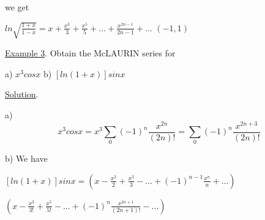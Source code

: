 \documentclass[11pt,a4paper]{article}
\begin{document}
we get  \vspace{0.25cm}

\hspace{0.75cm} $ln \sqrt{\frac{1+x}{1-x}} = x + \frac{x^3}{3} + \frac{x^5}{5} + ... + \frac{x^{2n-1}}{2n-1} + ... $  \hspace{2.25cm} $(-1,1)$ \vspace{0.3cm}

\hspace{0.5cm} \underline{Example 3}. Obtain the McLAURIN series for \vspace{0.25cm}

\hspace{0.5cm} a) $x^3 cosx$ \hspace{2cm} b) $[ln(1+x)]sinx$ \vspace{0.25cm}

\hspace{0.5cm} \underline{Solution}. \vspace{0.25cm}

\hspace{0.5cm} a) $$x^3 cosx = x^3 \sum_{0} (-1)^n \frac{x^{2n}}{(2n)!} =   \sum_{0} (-1)^n \frac{x^{2n+3}}{(2n)!} $$ \vspace{0.25cm}

\hspace{0.5cm} b) We have \vspace{0.25cm}

\hspace{1cm} $ [ln(1+x)] sinx = (x- \frac{x^2}{2} + \frac{x^3}{3} - ... + (-1)^{n-1} \frac{x^n}{n} + ... )  $ \vspace{0.25cm}

\hspace{4.20cm} $ (x - \frac{x^3}{3!} + \frac{x^5}{5!} - ... + (-1)^n \frac{x^{2n+1}}{(2n+1)!} - ...)         $
\end{document}
